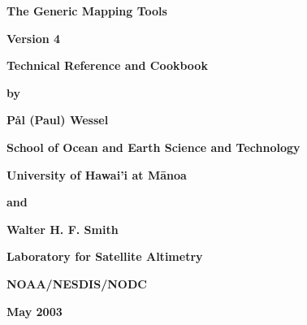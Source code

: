 %
%

\thispagestyle{empty}

\begin{center}
\huge
\textbf{The Generic Mapping Tools}\par 
\vspace{0.5\baselineskip}


\Huge
\textbf{Version 4}\par 
\vspace{0.25\baselineskip}

\huge
\textbf{Technical Reference and Cookbook}\par 

\large
\vspace{0.75\baselineskip}
\textbf{by}\par 
\vspace{0.75\baselineskip}

\huge
\textbf{P\aa l (Paul) Wessel}\par 
\vspace{0.5\baselineskip}

\Large
\textbf{School of Ocean and Earth Science and Technology}\par 
\textbf{University of Hawai'i at M\={a}noa}\par 

\large
\vspace{0.75\baselineskip}
\textbf{and}\par 
\vspace{0.75\baselineskip}

\huge
\textbf{Walter H. F. Smith}\par 
\vspace{0.5\baselineskip}

\Large
\textbf{Laboratory for Satellite Altimetry}\par 
\textbf{NOAA/NESDIS/NODC}\par 
\vspace{0.5\baselineskip}

\large
\textbf{May 2003}\par 
\vspace{\baselineskip}

\end{center}
